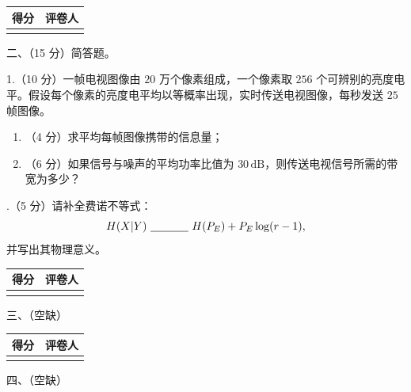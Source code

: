 \documentclass[UTF8,a4paper,12pt]{ctexart}
\newcommand{\blank}[1][3cm]{\underline{\hspace{#1}}}
\begin{document}
\noindent
\begin{minipage}[t]{0.26\textwidth}
\renewcommand{\arraystretch}{1.5}
\begin{tabular}{|C{1.5cm}|C{2.3cm}|}
\hline
得分 & 评卷人 \\
\hline
\rule{0pt}{0.8cm}&  \\
\hline
\end{tabular}
\end{minipage}
\hspace{0.02\textwidth}
\begin{minipage}[t]{0.68\textwidth}
{\heiti 二、（15 分）简答题。}

1.（10 分）一帧电视图像由 $20$ 万个像素组成，一个像素取 $256$ 个可辨别的亮度电平。假设每个像素的亮度电平均以等概率出现，实时传送电视图像，每秒发送 $25$ 帧图像。
\end{minipage}
\begin{enumerate}[label=（\arabic*）, leftmargin=2.5em]
\item（4 分）求平均每帧图像携带的信息量；
\item（6 分）如果信号与噪声的平均功率比值为 $30\,\mathrm{dB}$，则传送电视信号所需的带宽为多少？
\end{enumerate}

.（5 分）请补全费诺不等式：
\[
H(X|Y)\ \blank[1.2cm]\ H(P_E)+P_E\log(r-1),
\]
并写出其物理意义。

\vspace{13.0 cm}

\noindent
\begin{minipage}[t]{0.26\textwidth}
\renewcommand{\arraystretch}{1.5}
\begin{tabular}{|C{1.5cm}|C{2.3cm}|}
\hline
得分 & 评卷人 \\
\hline
\rule{0pt}{0.8cm}&  \\
\hline
\end{tabular}
\end{minipage}
\hspace{0.02\textwidth}
\begin{minipage}[t]{0.68\textwidth}
{\heiti 三、（空缺）}
\end{minipage}

\vspace{2.0em}

\noindent
\begin{minipage}[t]{0.26\textwidth}
\renewcommand{\arraystretch}{1.5}
\begin{tabular}{|C{1.5cm}|C{2.3cm}|}
\hline
得分 & 评卷人 \\
\hline
\rule{0pt}{0.8cm}&  \\
\hline
\end{tabular}
\end{minipage}
\hspace{0.02\textwidth}
\begin{minipage}[t]{0.68\textwidth}
{\heiti 四、（空缺）}
\end{minipage}
\end{document}
